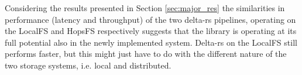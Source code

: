 Considering the results presented in Section \ref{sec:major_res} the similarities in performance (latency and throughput) of the two delta-rs pipelines, operating on the \gls{LocalFS} and \gls{HopsFS} respectively suggests that the library is operating at its full potential also in the newly implemented system. Delta-rs on the \gls{LocalFS} still performs faster, but this might just have to do with the different nature of the two storage systems, i.e. local and distributed.







